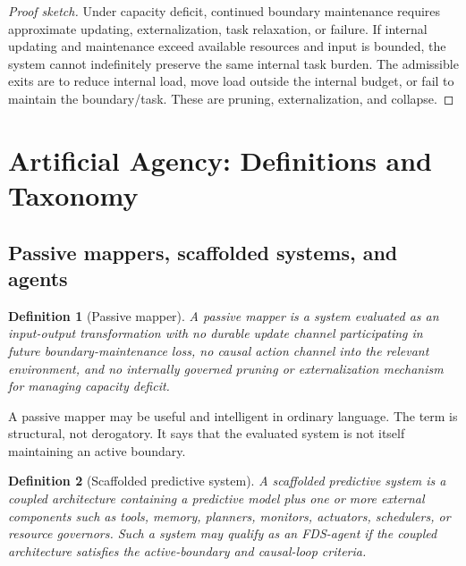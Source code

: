 \documentclass[10pt,a4paper,twocolumn,aps,prl]{revtex4-2}
\newtheorem{definition}{Definition}
\begin{document}
\begin{proof}[Proof sketch]
Under capacity deficit, continued boundary maintenance requires approximate updating, externalization, task relaxation, or failure. If internal updating and maintenance exceed available resources and input is bounded, the system cannot indefinitely preserve the same internal task burden. The admissible exits are to reduce internal load, move load outside the internal budget, or fail to maintain the boundary/task. These are pruning, externalization, and collapse.
\end{proof}

\section{Artificial Agency: Definitions and Taxonomy}

\subsection{Passive mappers, scaffolded systems, and agents}

\begin{definition}[Passive mapper]
A passive mapper is a system evaluated as an input-output transformation with no durable update channel participating in future boundary-maintenance loss, no causal action channel into the relevant environment, and no internally governed pruning or externalization mechanism for managing capacity deficit.
\end{definition}

A passive mapper may be useful and intelligent in ordinary language. The term is structural, not derogatory. It says that the evaluated system is not itself maintaining an active boundary.

\begin{definition}[Scaffolded predictive system]
A scaffolded predictive system is a coupled architecture containing a predictive model plus one or more external components such as tools, memory, planners, monitors, actuators, schedulers, or resource governors. Such a system may qualify as an FDS-agent if the coupled architecture satisfies the active-boundary and causal-loop criteria.
\end{definition}
\end{document}
